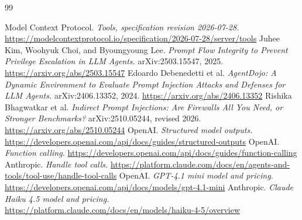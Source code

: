 \documentclass[10pt,twocolumn,letterpaper]{article}
\begin{document}
\begin{thebibliography}{99}
\small\raggedright{}
 Model Context Protocol. \emph{Tools, specification revision 2026-07-28.} \url{https://modelcontextprotocol.io/specification/2026-07-28/server/tools}
 Juhee Kim, Woohyuk Choi, and Byoungyoung Lee. \emph{Prompt Flow Integrity to Prevent Privilege Escalation in LLM Agents.} arXiv:2503.15547, 2025. \url{https://arxiv.org/abs/2503.15547}
 Edoardo Debenedetti et al. \emph{AgentDojo: A Dynamic Environment to Evaluate Prompt Injection Attacks and Defenses for LLM Agents.} arXiv:2406.13352, 2024. \url{https://arxiv.org/abs/2406.13352}
 Rishika Bhagwatkar et al. \emph{Indirect Prompt Injections: Are Firewalls All You Need, or Stronger Benchmarks?} arXiv:2510.05244, revised 2026. \url{https://arxiv.org/abs/2510.05244}
 OpenAI. \emph{Structured model outputs.} \url{https://developers.openai.com/api/docs/guides/structured-outputs}
 OpenAI. \emph{Function calling.} \url{https://developers.openai.com/api/docs/guides/function-calling}
 Anthropic. \emph{Handle tool calls.} \url{https://platform.claude.com/docs/en/agents-and-tools/tool-use/handle-tool-calls}
 OpenAI. \emph{GPT-4.1 mini model and pricing.} \url{https://developers.openai.com/api/docs/models/gpt-4.1-mini}
 Anthropic. \emph{Claude Haiku 4.5 model and pricing.} \url{https://platform.claude.com/docs/en/models/haiku-4-5/overview}
\end{thebibliography}
\end{document}
